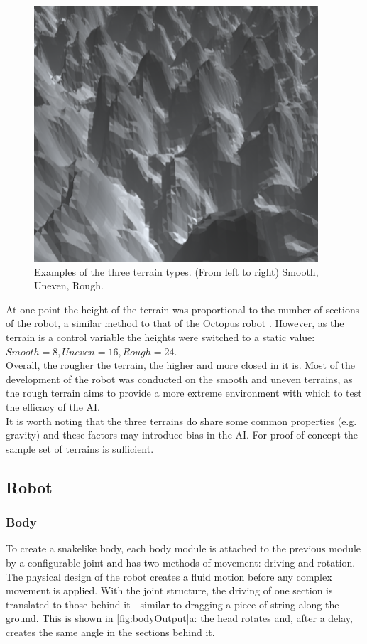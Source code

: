 \documentclass{article}
\begin{document}
\begin{figure}[H]
\includegraphics[scale=0.3]{roughTerrain}
\caption{Examples of the three terrain types. (From left to right) Smooth, Uneven, Rough.}
\end{figure}
At one point the height of the terrain was proportional to the number of sections of the robot, a similar method to that of the Octopus robot . However, as the terrain is a control variable the heights were switched to a static value: $Smooth=8, Uneven=16, Rough=24$.\\
Overall, the rougher the terrain, the higher and more closed in it is. Most of the development of the robot was conducted on the smooth and uneven terrains, as the rough terrain aims to provide a more extreme environment with which to test the efficacy of the AI.\\
It is worth noting that the three terrains do share some common properties (e.g. gravity) and these factors may introduce bias in the AI. For proof of concept the sample set of terrains is sufficient.\\


\subsection{Robot}
\label{sec:Robot Imp}
\subsubsection{Body}
\label{sec:Body Imp}
To create a snakelike body, each body module is attached to the previous module by a configurable joint  and has two methods of movement: driving and rotation. The physical design of the robot creates a fluid motion before any complex movement is applied. With the joint structure, the driving of one section is translated to those behind it - similar to dragging a piece of string along the ground. This is shown in \autoref{fig:bodyOutput}a: the head rotates and, after a delay, creates the same angle in the sections behind it.\\
\end{document}
